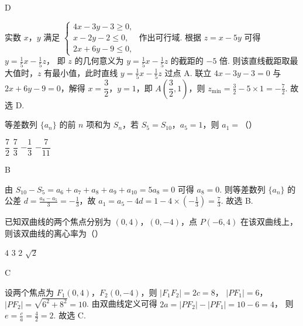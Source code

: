 \begin{answer}
D
\end{answer}

\begin{solution}
实数 \(x\)，\(y\) 满足 \(\begin{cases}
4x-3y-3\ge 0,\\
x-2y-2\le 0,\\
2x+6y-9\le 0,
\end{cases}\) 作出可行域.
根据 \( z=x-5y \) 可得
\(y=\frac{1}{5}x-\frac{1}{5}z\)，
即 \( z \) 的几何意义为 \( y=\frac{1}{5}x-\frac{1}{5}z \) 的截距的 \( -5 \) 倍.
则该直线截距取最大值时，\( z \) 有最小值，此时直线 \( y=\frac{1}{5}x-\frac{1}{5}z \) 过点 A.
联立 \( 4x-3y-3=0 \) 与 \( 2x+6y-9=0 \)，解得 \( x=\dfrac{3}{2} \)，\( y=1 \)，即 \( A\left( \dfrac{3}{2},1 \right) \)，则
\(z_{\min}=\frac{3}{2}-5\times 1=-\frac{7}{2}\).
故选 D.
\end{solution}

\begin{problem}
等差数列 \( \{a_n\} \) 的前 \( n \) 项和为 \( S_n \)，若 \( S_5=S_{10} \)，\( a_5=1 \)，则 \( a_1= \)（\quad）

\choices
    {\( \dfrac{7}{2} \)}
    {\( \dfrac{7}{3} \)}
    {\( -\dfrac{1}{3} \)}
    {\( -\dfrac{7}{11} \)}
\end{problem}

\begin{answer}
B
\end{answer}

\begin{solution}
由 \(S_{10}-S_5=a_6+a_7+a_8+a_9+a_{10}=5a_8=0\) 可得 \( a_8=0 \).
则等差数列 \( \{a_n\} \) 的公差 \( d=\frac{a_8-a_5}{3}=-\frac{1}{3} \)，故
 \(a_1=a_5-4d=1-4\times \left( -\frac{1}{3} \right)=\frac{7}{3}\).
故选 B.
\end{solution}

\begin{problem}
已知双曲线的两个焦点分别为 \( (0,4) \)，\( (0,-4) \)，点 \( P(-6,4) \) 在该双曲线上，则该双曲线的离心率为（\quad）

\choices
    {\( 4 \)}
    {\( 3 \)}
    {\( 2 \)}
    {\( \sqrt{2} \)}
\end{problem}

\begin{answer}
C
\end{answer}

\begin{solution}
设两个焦点为 \( F_1(0,4) \)，\( F_2(0,-4) \)，则
\(\left| F_1F_2 \right|=2c=8\)，
\(\left| PF_1 \right|=6\)，
\(\left| PF_2 \right|=\sqrt{6^2+8^2}=10\).
由双曲线定义可得
\(2a=\left| PF_2 \right|-\left| PF_1 \right|=10-6=4\)，
则
\(e=\frac{c}{a}=\frac{4}{2}=2\).
故选 C.
\end{solution}

